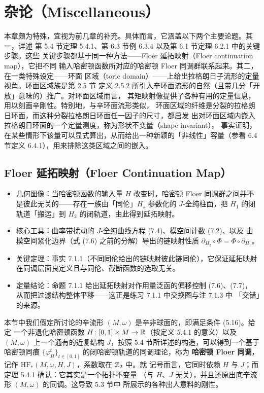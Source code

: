 \chapter{杂论（Miscellaneous）}

本章颇为特殊，宜视为前几章的补充。具体而言，它涵盖以下两个主要论题。其一，详述
第 5.4 节定理 5.4.1、第 6.3 节例 6.3.4 以及第 6.1 节定理 6.2.1 中的关键步骤。这些
关键步骤都基于同一种方法——Floer 延拓映射（Floer continuation map），它把不同
输入哈密顿函数所对应的哈密顿 Floer 同调群联系起来。其二，在一类特殊设定——环面
区域（toric domain）——上给出拉格朗日子流形的定量视角。环面区域族是第 2.5 节
定义 2.5.2 所引入辛环面流形的自然（且带几分「开放」意味的）推广。对环面区域而言，
其矩映射像提供了各种有用的定量信息，用以刻画辛刚性。特别地，与辛环面流形类似，
环面区域的纤维是分裂的拉格朗日环面，而这种分裂拉格朗日环面任一因子的尺寸，都启发
出对环面区域内嵌入拉格朗日环面的一个定量测度，称为形状不变量（shape invariant）。
事实证明，在某些情形下该量可以显式算出，从而给出一种新颖的「非线性」容量（参看
6.4 节定义 6.4.1），用来排除这类区域之间的嵌入。

\section{Floer 延拓映射（Floer Continuation Map）}

\begin{keytakeaways}
\begin{itemize}
  \item 几何图像：当哈密顿函数的输入量 $H$ 改变时，哈密顿 Floer 同调群之间并不
        是彼此无关的——存在一族由「同伦」$H_s$ 参数化的 $J$-全纯柱面，把 $H_1$
        的闭轨道「搬运」到 $H_2$ 的闭轨道，由此得到延拓映射。
  \item 核心工具：曲率带扰动的 $J$-全纯曲线方程 (7.4)、模空间计数 (7.2)、以及
        由模空间紧化边界（式 (7.6) 之前的分解）导出的链映射性质
        $\partial_{H_2}\circ\Phi=\Phi\circ\partial_{H_1}$。
  \item 关键定理：事实 7.1.1（不同同伦给出的链映射彼此链同伦），它保证延拓映射
        在同调层面良定义且与同伦、截断函数的选取无关。
  \item 定量结论：命题 7.1.1 给出延拓映射对作用量泛函的偏移控制 (7.6)、(7.7)，
        从而把过滤结构整体平移——这正是练习 7.1.1 中交换图与注 7.1.3 中
        「交错」的来源。
\end{itemize}
\end{keytakeaways}

本节中我们假定所讨论的辛流形 $(M,\omega)$ 是辛非球面的，即满足条件 (5.16)。给定
一个非退化哈密顿函数 $H\colon[0,1]\times M\to\mathbb{R}$（按定义 5.4.1 的意义）以及
$(M,\omega)$ 上一个通有的近复结构 $J$，按照 5.4 节所详述的构造，可以得到一个基于
哈密顿同痕 $\{\varphi_H^t\}_{t\in[0,1]}$ 的闭哈密顿轨道的同调理论，称为\textbf{
哈密顿 Floer 同调}，记作 $\mathrm{HF}_*(M,\omega,H,J)$，系数取在 $\mathbb{Z}_2$ 中。就
记号而言，它同时依赖 $H$ 与 $J$；而定理 5.4.1 确认：它其实是一个拓扑不变量
（与 $H$、$J$ 无关），并且还原出底辛流形 $(M,\omega)$ 的同调。这导致 5.3 节中
所展示的各种出人意料的刚性。


